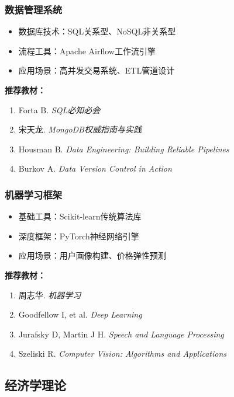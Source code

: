 \documentclass[lang=cn,12pt,a4paper]{elegantpaper}
\begin{document}
\subsubsection{数据管理系统}
\begin{itemize}[leftmargin=*,noitemsep]
    \item 数据库技术：SQL关系型、NoSQL非关系型
    \item 流程工具：Apache Airflow工作流引擎
    \item 应用场景：高并发交易系统、ETL管道设计
\end{itemize}

\noindent \textbf{推荐教材：}
\begin{enumerate}[leftmargin=*,nosep]
    \item Forta B. \textit{SQL必知必会}
    \item 宋天龙. \textit{MongoDB权威指南与实践}
    \item Housman B. \textit{Data Engineering: Building Reliable Pipelines}
    \item Burkov A. \textit{Data Version Control in Action}
\end{enumerate}

\subsubsection{机器学习框架}
\begin{itemize}[leftmargin=*,noitemsep]
    \item 基础工具：Scikit-learn传统算法库
    \item 深度框架：PyTorch神经网络引擎
    \item 应用场景：用户画像构建、价格弹性预测
\end{itemize}

\noindent \textbf{推荐教材：}
\begin{enumerate}[leftmargin=*,nosep]
    \item 周志华. \textit{机器学习}
    \item Goodfellow I, et al. \textit{Deep Learning}
    \item Jurafsky D, Martin J H. \textit{Speech and Language Processing}
    \item Szeliski R. \textit{Computer Vision: Algorithms and Applications}
\end{enumerate}

\subsection{经济学理论}
\end{document}
